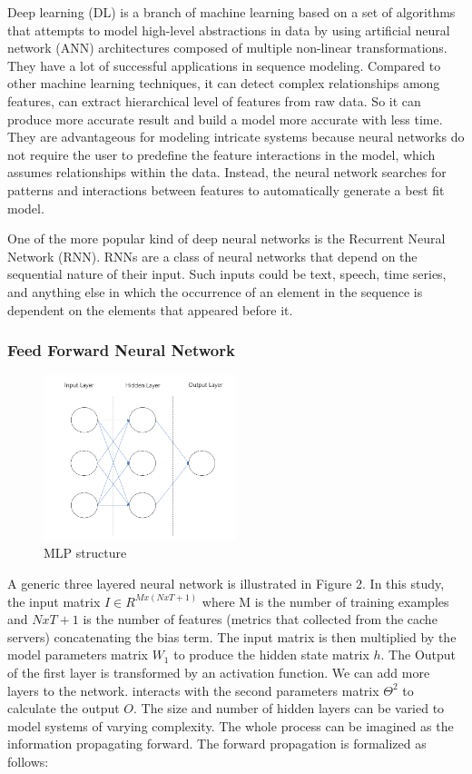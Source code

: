 \documentclass[5p]{elsarticle}
\begin{document}
Deep learning (DL) is a branch of machine learning based on a set of algorithms that attempts to model high-level abstractions in data by using artificial neural network (ANN) architectures composed of multiple non-linear transformations. They have a lot of successful applications in sequence modeling. Compared to other machine learning techniques, it can detect complex relationships among features, can extract hierarchical level of features from raw data. So it can produce more accurate result and build a model more accurate with less time. They are advantageous for modeling intricate systems because neural networks do not require the user to predefine the feature interactions in the model, which assumes relationships within the data. Instead, the neural network searches for patterns and interactions between features to automatically generate a best fit model.

One of the more popular kind of deep neural networks is the Recurrent Neural Network (RNN). RNNs are a class of neural networks that depend on the sequential nature of their input. Such inputs could be text, speech, time series, and anything else in which the occurrence of an element in the sequence is dependent on the elements that appeared before it.

\subsubsection{Feed Forward Neural Network}
\begin{figure}[h]
    \centering
    \includegraphics[width=0.5\textwidth]{mlp.png}
    \caption{MLP structure}
    \label{fig:RNN}
\end{figure}

A generic three layered neural network is illustrated in Figure 2. In this study, the input matrix $I \in R^{Mx(NxT+1)}$  where M is the number of training examples and $NxT+1$ is the number of features (metrics that collected from the cache servers) concatenating the bias term. The input matrix is then multiplied by the model parameters matrix $W_1$ to produce the hidden state matrix $h$. The Output of the first layer is transformed by an activation function. We can add more layers to the network. interacts with the second parameters matrix $\Theta^2$ to calculate the output $O$. The size and number of hidden layers can be varied to model systems of varying complexity. The whole process can be imagined as the information propagating forward. The forward propagation is formalized as follows:
\end{document}
